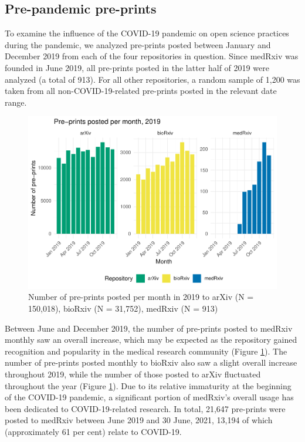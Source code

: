 \documentclass[
]{article}
\begin{document}
\hypertarget{pre-pandemic-pre-prints}{%
\subsection{Pre-pandemic pre-prints}\label{pre-pandemic-pre-prints}}

To examine the influence of the COVID-19 pandemic on open science practices during the pandemic, we analyzed pre-prints posted between January and December 2019 from each of the four repositories in question. Since medRxiv was founded in June 2019, all pre-prints posted in the latter half of 2019 were analyzed (a total of 913). For all other repositories, a random sample of 1,200 was taken from all non-COVID-19-related pre-prints posted in the relevant date range.

\begin{figure}[H]

{\centering \includegraphics[width=0.9\linewidth]{paper_files/figure-latex/2019-results-med-arxiv-1} 

}

\caption{Number of pre-prints posted per month in 2019 to arXiv (N = 150,018), bioRxiv (N = 31,752), medRxiv (N = 913)}\label{fig:2019-results-med-arxiv}
\end{figure}

Between June and December 2019, the number of pre-prints posted to medRxiv monthly saw an overall increase, which may be expected as the repository gained recognition and popularity in the medical research community (Figure \ref{fig:2019-results-med-arxiv}). The number of pre-prints posted monthly to bioRxiv also saw a slight overall increase throughout 2019, while the number of those posted to arXiv fluctuated throughout the year (Figure \ref{fig:2019-results-med-arxiv}). Due to its relative immaturity at the beginning of the COVID-19 pandemic, a significant portion of medRxiv's overall usage has been dedicated to COVID-19-related research. In total, 21,647 pre-prints were posted to medRxiv between June 2019 and 30 June, 2021, 13,194 of which (approximately 61 per cent) relate to COVID-19.
\end{document}
